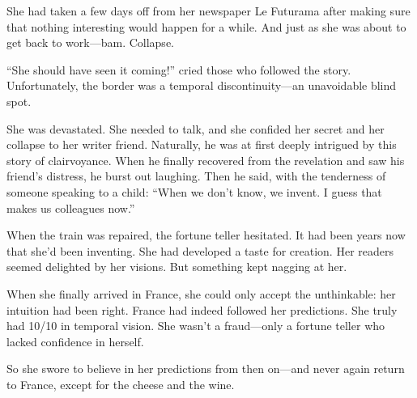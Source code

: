 {She had taken a few days off from her newspaper Le Futurama after making sure that nothing interesting would happen for a while. And just as she was about to get back to work—bam. Collapse.

“She should have seen it coming!” cried those who followed the story.
Unfortunately, the border was a temporal discontinuity—an unavoidable blind spot.

She was devastated. She needed to talk, and she confided her secret and her collapse to her writer friend. Naturally, he was at first deeply intrigued by this story of clairvoyance. When he finally recovered from the revelation and saw his friend’s distress, he burst out laughing. Then he said, with the tenderness of someone speaking to a child:
“When we don’t know, we invent. I guess that makes us colleagues now.”

When the train was repaired, the fortune teller hesitated. It had been years now that she’d been inventing. She had developed a taste for creation. Her readers seemed delighted by her visions. But something kept nagging at her.

When she finally arrived in France, she could only accept the unthinkable: her intuition had been right. France had indeed followed her predictions. She truly had 10/10 in temporal vision. She wasn’t a fraud—only a fortune teller who lacked confidence in herself.

So she swore to believe in her predictions from then on—and never again return to France, except for the cheese and the wine.}

